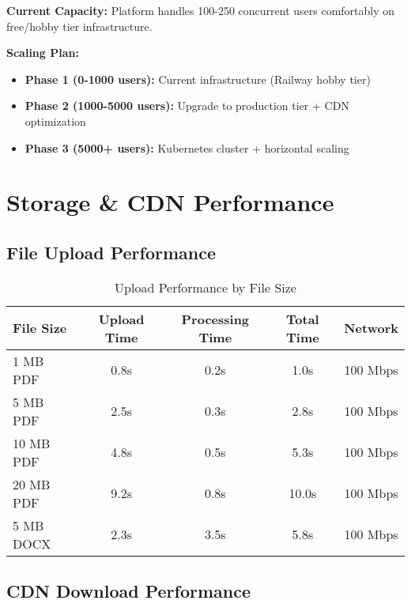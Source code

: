 \begin{infobox}
\textbf{Current Capacity:} Platform handles 100-250 concurrent users comfortably on free/hobby tier infrastructure.

\textbf{Scaling Plan:}
\begin{itemize}
    \item \textbf{Phase 1 (0-1000 users):} Current infrastructure (Railway hobby tier)
    \item \textbf{Phase 2 (1000-5000 users):} Upgrade to production tier + CDN optimization
    \item \textbf{Phase 3 (5000+ users):} Kubernetes cluster + horizontal scaling
\end{itemize}
\end{infobox}

\section{Storage \& CDN Performance}
\label{sec:storage-performance}

\subsection{File Upload Performance}

\begin{table}[H]
\centering
\caption{Upload Performance by File Size}
\label{tab:upload-performance}
\begin{tabular}{@{}lcccc@{}}
\toprule
\textbf{File Size} & \textbf{Upload Time} & \textbf{Processing Time} & \textbf{Total Time} & \textbf{Network} \\
\midrule
1 MB PDF & 0.8s & 0.2s & 1.0s & 100 Mbps \\
5 MB PDF & 2.5s & 0.3s & 2.8s & 100 Mbps \\
10 MB PDF & 4.8s & 0.5s & 5.3s & 100 Mbps \\
20 MB PDF & 9.2s & 0.8s & 10.0s & 100 Mbps \\
5 MB DOCX & 2.3s & 3.5s & 5.8s & 100 Mbps \\
\bottomrule
\end{tabular}
\end{table}

\subsection{CDN Download Performance}

